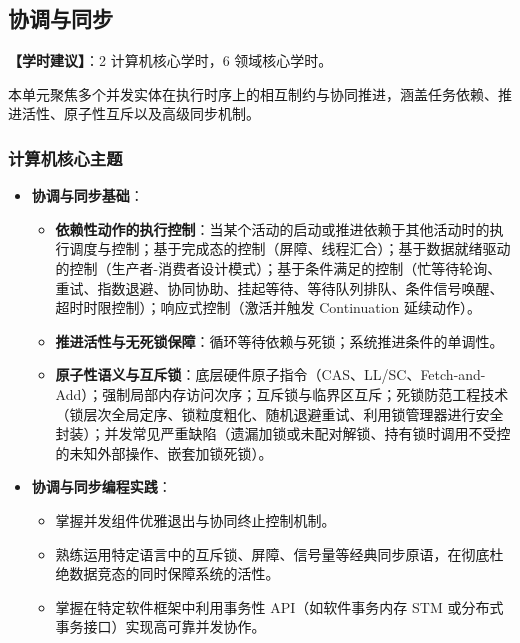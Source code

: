 \subsection{协调与同步}
\textbf{【学时建议】}：2 计算机核心学时，6 领域核心学时。

本单元聚焦多个并发实体在执行时序上的相互制约与协同推进，涵盖任务依赖、推进活性、原子性互斥以及高级同步机制。

\subsubsection{计算机核心主题}
\begin{itemize}
    \item \textbf{协调与同步基础}：
    \begin{itemize}
        \item \textbf{依赖性动作的执行控制}：当某个活动的启动或推进依赖于其他活动时的执行调度与控制；基于完成态的控制（屏障、线程汇合）；基于数据就绪驱动的控制（生产者-消费者设计模式）；基于条件满足的控制（忙等待轮询、重试、指数退避、协同协助、挂起等待、等待队列排队、条件信号唤醒、超时时限控制）；响应式控制（激活并触发 Continuation 延续动作）。
        \item \textbf{推进活性与无死锁保障}：循环等待依赖与死锁；系统推进条件的单调性。
        \item \textbf{原子性语义与互斥锁}：底层硬件原子指令（CAS、LL/SC、Fetch-and-Add）；强制局部内存访问次序；互斥锁与临界区互斥；死锁防范工程技术（锁层次全局定序、锁粒度粗化、随机退避重试、利用锁管理器进行安全封装）；并发常见严重缺陷（遗漏加锁或未配对解锁、持有锁时调用不受控的未知外部操作、嵌套加锁死锁）。
    \end{itemize}
    \item \textbf{协调与同步编程实践}：
    \begin{itemize}
        \item 掌握并发组件优雅退出与协同终止控制机制。
        \item 熟练运用特定语言中的互斥锁、屏障、信号量等经典同步原语，在彻底杜绝数据竞态的同时保障系统的活性。
        \item 掌握在特定软件框架中利用事务性 API（如软件事务内存 STM 或分布式事务接口）实现高可靠并发协作。
    \end{itemize}
\end{itemize}

